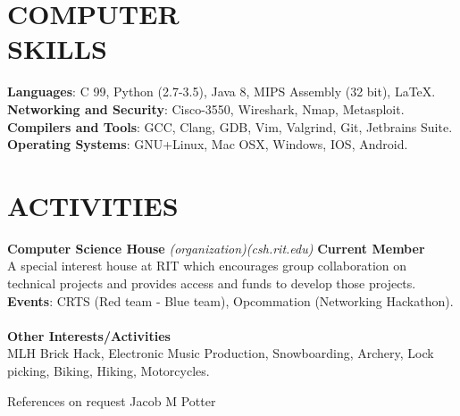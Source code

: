 \documentclass[line,margin]{res}
\begin{document}
\begin{resume}
\section{COMPUTER\\SKILLS}
\textbf{Languages}: C 99, Python (2.7-3.5), Java 8, MIPS Assembly (32 bit), \LaTeX.
\\
\textbf{Networking and Security}: Cisco-3550, Wireshark, Nmap, Metasploit.  
\\
\textbf{Compilers and Tools}: GCC, Clang, GDB, Vim, Valgrind, Git, 
Jetbrains Suite. 
\\
\textbf{Operating Systems}: 
GNU+Linux, Mac OSX, Windows, IOS, Android.

\section{ACTIVITIES}
{\textbf{Computer Science House}}
{\sl (organization)}{\sl (csh.rit.edu)}\hfill
\textbf{Current Member}\\
A special interest house at RIT which encourages group collaboration on technical 
projects and provides access and funds to develop those projects.\\
\textbf{Events}: 
CRTS (Red team - Blue team), Opcommation (Networking Hackathon).\\\\
\textbf{Other Interests/Activities}\\
MLH Brick Hack, Electronic Music Production, Snowboarding, Archery, Lock picking, Biking, Hiking, Motorcycles.

\end{resume}
\scriptsize{References on request} \hfill 
\scriptsize{Jacob M Potter} \hfill 
\end{document}
